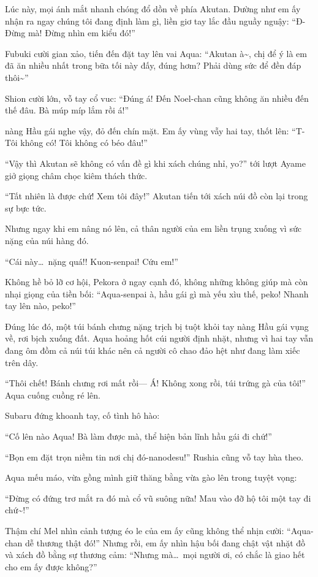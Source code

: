 \documentclass[../main.tex]{subfiles}
\begin{document}
Lúc này, mọi ánh mắt nhanh chóng đổ dồn về phía Akutan. Dường như em ấy nhận ra ngay chúng tôi đang định làm gì, liền giơ tay lắc đầu nguầy nguậy: ``Đ-Đừng mà! Đừng nhìn em kiểu đó!''

Fubuki cười gian xảo, tiến đến đặt tay lên vai Aqua: ``Akutan à\~{}, chị để ý là em đã ăn nhiều nhất trong bữa tối này đấy, đúng hơm? Phải dùng sức để đền đáp thôi\~{}''

Shion cười lớn, vỗ tay cổ vuc: ``Đúng á! Đến Noel-chan cũng không ăn nhiều đến thế đâu. Bà múp míp lắm rồi á!''

nàng Hầu gái nghe vậy, đỏ đến chín mặt. Em ấy vùng vẫy hai tay, thốt lên: ``T-Tôi không có! Tôi không có béo đâu!''

``Vậy thì Akutan sẽ không có vấn đề gì khi xách chúng nhỉ, yo?'' tới lượt Ayame giở giọng châm chọc kiêm thách thức.

``Tất nhiên là được chứ! Xem tôi đây!'' Akutan tiến tới xách núi đồ còn lại trong sự bực tức.

Nhưng ngay khi em nâng nó lên, cả thân người của em liền trụng xuống vì sức nặng của núi hàng đó.

``Cái này\dots\ nặng quá!! Kuon-senpai! Cứu em!''

Không hề bỏ lỡ cơ hội, Pekora ở ngay cạnh đó, không những không giúp mà còn nhại giọng của tiền bối: ``Aqua-senpai à, hầu gái gì mà yếu xìu thế, peko! Nhanh tay lên nào, peko!''

Đúng lúc đó, một túi bánh chưng nặng trịch bị tuột khỏi tay nàng Hầu gái vụng về, rơi bịch xuống đất. Aqua hoảng hốt cúi người định nhặt, nhưng vì hai tay vẫn đang ôm đồm cả núi túi khác nên cả người cô chao đảo hệt như đang làm xiếc trên dây.

``Thôi chết! Bánh chưng rơi mất rồi--- Á! Không xong rồi, túi trứng gà của tôi!'' Aqua cuống cuồng ré lên.

Subaru đứng khoanh tay, cố tình hô hào:

``Cố lên nào Aqua! Bà làm được mà, thể hiện bản lĩnh hầu gái đi chứ!''

``Bọn em đặt trọn niềm tin nơi chị đó-nanodesu!'' Rushia cũng vỗ tay hùa theo.

Aqua mếu máo, vừa gồng mình giữ thăng bằng vừa gào lên trong tuyệt vọng:

``Đừng có đứng trơ mắt ra đó mà cổ vũ suông nữa! Mau vào đỡ hộ tôi một tay đi chứ\~{}!''

Thậm chí Mel nhìn cảnh tượng éo le của em ấy cũng không thể nhịn cười: ``Aqua-chan dễ thương thật đó!'' Nhưng rồi, em ấy nhìn hậu bối đang chật vật nhặt đồ và xách đồ bằng sự thương cảm: ``Nhưng mà\dots\ mọi người ơi, có chắc là giao hết cho em ấy được không?''
\end{document}
